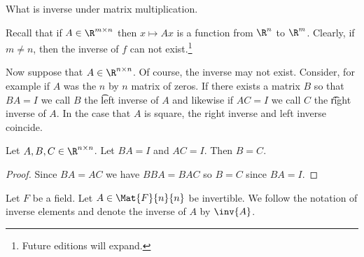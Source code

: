 

What is inverse under matrix multiplication.


Recall that if $A \in \R^{m \times n}$ then $x \mapsto Ax$ is a function from $\R^{n}$ to $\R^{m}$.
Clearly, if $m \neq n$, then the inverse of $f$ can not exist.\footnote{Future editions will expand.}

Now suppose that $A \in \R^{n \times n}$.
Of course, the inverse may not exist.
Consider, for example if $A$ was the $n$ by $n$ matrix of zeros.
If there exists a matrix $B$ so that $BA = I$ we call $B$ the \t{left inverse} of $A$ and likewise if $AC = I$ we call $C$ the \t{right inverse} of $A$.
In the case that $A$ is square, the right inverse and left inverse coincide.

\begin{proposition}
  Let $A, B, C \in \R^{n \times n}$.
  Let $BA = I$ and $AC = I$.
  Then $B = C$.
  \begin{proof}
  Since $BA = AC$ we have $BBA = BAC$ so $B = C$ since $BA = I$.
  \end{proof}
\end{proposition}


Let $F$ be a field.
Let $A \in \Mat{F}{n}{n}$
be invertible.
We follow the notation of
inverse elements and denote
the inverse of $A$ by
$\inv{A}$.

\blankpage
